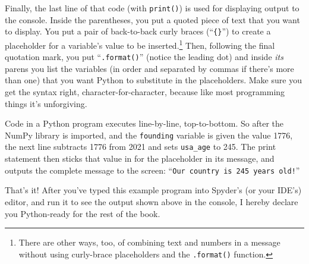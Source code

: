 \smallskip

Finally, the last line of that code (with \texttt{print()}) is used for
displaying output to the console. Inside the parentheses, you put a quoted
piece of text that you want to display. You put a pair of back-to-back curly
braces (``\texttt{\{\}}'') to create a placeholder for a variable's value to be
inserted.\footnote{There are other ways, too, of combining text and numbers in
a message without using curly-brace placeholders and the \texttt{.format()}
function.} Then, following the final quotation mark, you put
``\texttt{.format()}'' (notice the leading dot) and inside \textit{its} parens
you list the variables (in order and separated by commas if there's more than
one) that you want Python to substitute in the placeholders. Make sure you get
the syntax right, character-for-character, because like most programming things
it's unforgiving.

\smallskip

Code in a Python program executes line-by-line, top-to-bottom. So after the
NumPy library is imported, and the \texttt{founding} variable is given the
value 1776, the next line subtracts 1776 from 2021 and sets \texttt{usa\_age}
to 245. The print statement then sticks that value in for the placeholder in
its message, and outputs the complete message to the screen: ``\texttt{Our
country is 245 years old!}''

\medskip

That's it! After you've typed this example program into Spyder's (or your
IDE's) editor, and run it to see the output shown above in the console, I
hereby declare you Python-ready for the rest of the book.
